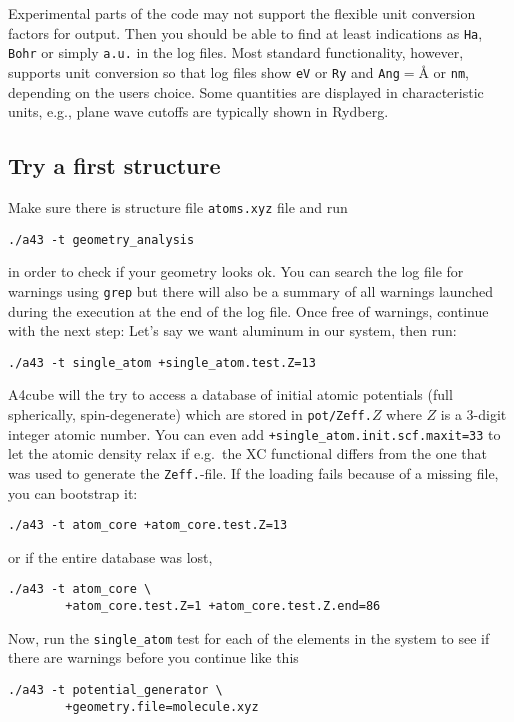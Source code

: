 \documentclass[oribibl]{llncs}
\newcommand{\ttt}[1]{\texttt{#1}}
\newcommand{\codename}{A4cube}
\begin{document}
Experimental parts of the code may not support the flexible unit conversion
factors for output. Then you should be able to find at least indications as \ttt{Ha}, \ttt{Bohr} or simply \ttt{a.u.} in the log files.
Most standard functionality, however, supports unit conversion so that log files
show \ttt{eV} or \ttt{Ry} and \ttt{Ang}$ = $\AA{} or \ttt{nm}, depending on the users choice.
Some quantities are displayed in characteristic units, e.g., plane wave cutoffs are typically shown in Rydberg.


\subsection{Try a first structure}
Make sure there is structure file \ttt{atoms.xyz} file and run
\begin{verbatim}
./a43 -t geometry_analysis
\end{verbatim}
in order to check if your geometry looks ok.
You can search the log file for warnings using \ttt{grep} but
there will also be a summary of all warnings launched during the execution at the end of the log file.
Once free of warnings, continue with the next step:
Let's say we want aluminum in our system, then run:
\begin{verbatim}
./a43 -t single_atom +single_atom.test.Z=13
\end{verbatim}


\codename{} will the try to access a database of initial atomic potentials
(full spherically, spin-degenerate) which are stored in \ttt{pot/Zeff.}$Z$
where $Z$ is a 3-digit integer atomic number.
You can even add \ttt{+single\_atom.init.scf.maxit=33} to let the atomic density relax if e.g.~the \ac{XC} functional differs from the one that was used to generate the \ttt{Zeff.}-file.
If the loading fails because of a missing file, you can bootstrap it:
\begin{verbatim}
./a43 -t atom_core +atom_core.test.Z=13
\end{verbatim}
or if the entire database was lost,
\begin{verbatim}
./a43 -t atom_core \
        +atom_core.test.Z=1 +atom_core.test.Z.end=86
\end{verbatim}

Now, run the \ttt{single\_atom} test for each of the elements in the system to see if there are warnings before you continue like this
\begin{verbatim}
./a43 -t potential_generator \
        +geometry.file=molecule.xyz
\end{verbatim}
\end{document}
